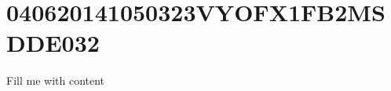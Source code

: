 \documentclass{article}
\begin{document}
\section{040620141050323VYOFX1FB2MSDDE032}
Fill me with content
\end{document}
